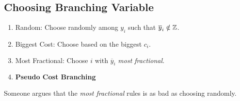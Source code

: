 \subsection{Choosing Branching Variable}
\begin{enumerate}
	\item Random: Choose randomly among \(y_{i}\) such that \(\overline{y}_{i}\notin\mathbb{\MakeUppercase{Z}}\).
	\item Biggest Cost: Choose based on the biggest \(c_{i}\).
	\item Most Fractional: Choose \(i\) with \(\overline{y}_{i}\) \emph{most fractional}.
	\item \textbf{Pseudo Cost Branching}
\end{enumerate}

\begin{note}
	Someone argues that the \emph{most fractional} rules is as bad as choosing randomly.
\end{note}
